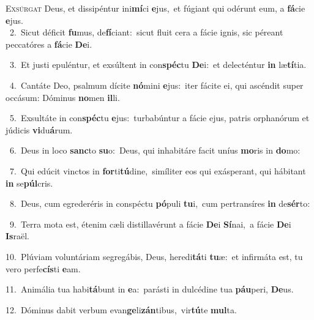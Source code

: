 \lettrine{\initial\textcolor{\initialcolor}{E}}{xsúrgat} Deus, et dissipéntur ini\-\textbf{mí}\-ci \textbf{e}\-jus,~\star et fúgiant qui odérunt eum, a \textbf{fá}\-cie \textbf{e}\-jus.\\
{\numbfont\textcolor{\numbcolor}{~2.}}~Sicut déficit \textbf{fu}\-mus, de\-\textbf{fí}\-ciant:~\star sicut fluit cera a fácie ignis, sic péreant peccatóres a \textbf{fá}\-cie \textbf{De}\-i.\par
{\numbfont\textcolor{\numbcolor}{~3.}}~Et justi epuléntur, et exsúltent in con\-\textbf{spéc}\-tu \textbf{De}\-i:~\star et delecténtur \textbf{in} læ\-\textbf{tí}\-tia.\par
{\numbfont\textcolor{\numbcolor}{~4.}}~Cantáte Deo, psalmum dícite \textbf{nó}\-mini \textbf{e}\-jus:~\star iter fácite ei, qui ascéndit super occásum: Dóminus \textbf{no}\-men \textbf{il}\-li.\par
{\numbfont\textcolor{\numbcolor}{~5.}}~Exsultáte in con\-\textbf{spéc}\-tu \textbf{e}\-jus:~\star turbabúntur a fácie ejus, patris orphanórum et júdicis \textbf{vi}\-du\-\textbf{á}\-rum.\par
{\numbfont\textcolor{\numbcolor}{~6.}}~Deus in loco \textbf{sanc}\-to \textbf{su}\-o:~\star Deus, qui inhabitáre facit uníus \textbf{mo}\-ris in \textbf{do}\-mo:\par
{\numbfont\textcolor{\numbcolor}{~7.}}~Qui edúcit vinctos in \textbf{for}\-ti\-\textbf{tú}\-dine,~\star simíliter eos qui exásperant, qui hábitant \textbf{in} se\-\textbf{púl}\-cris.\par
{\numbfont\textcolor{\numbcolor}{~8.}}~Deus, cum egrederéris in conspéctu \textbf{pó}\-puli \textbf{tu}\-i,~\star cum pertransíres \textbf{in} de\-\textbf{sér}\-to:\par
{\numbfont\textcolor{\numbcolor}{~9.}}~Terra mota est, étenim cæli distillavérunt a fácie \textbf{De}\-i \textbf{Sí}\-nai,~\star a fácie \textbf{De}\-i \textbf{Is}\-raël.\par
{\numbfont\textcolor{\numbcolor}{10.}}~Plúviam voluntáriam segregábis, Deus, heredi\-\textbf{tá}\-ti \textbf{tu}\-æ:~\star et infirmáta est, tu vero perfe\-\textbf{cís}\-ti \textbf{e}\-am.\par
{\numbfont\textcolor{\numbcolor}{11.}}~Animália tua habi\-\textbf{tá}\-bunt in \textbf{e}\-a:~\star parásti in dulcédine tua \textbf{páu}\-peri, \textbf{De}\-us.\par
{\numbfont\textcolor{\numbcolor}{12.}}~Dóminus dabit verbum evan\-\textbf{ge}\-li\-\textbf{zán}\-tibus,~\star vir\-\textbf{tú}\-te \textbf{mul}\-ta.\par
